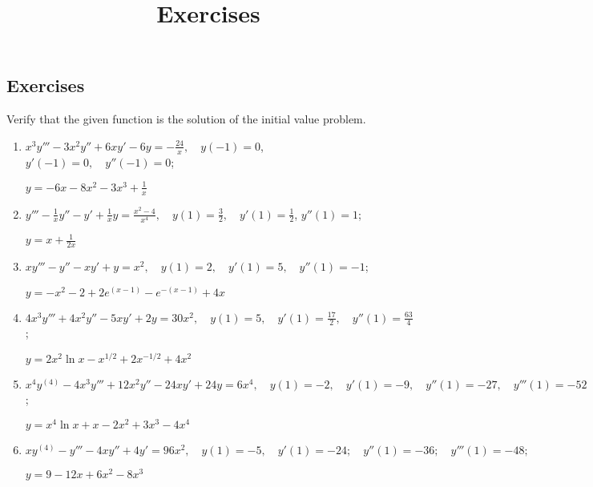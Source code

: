 \documentclass{ximera}
\title{Exercises} \license{CC BY-NC-SA 4.0}
\begin{document}
\begin{abstract}
\end{abstract}
\maketitle

\begin{onlineOnly}
\section*{Exercises}
\end{onlineOnly}



\begin{problem}\label{exer:9.1.1}
Verify that the given function is the solution of the initial
value problem.

\begin{enumerate}

\item $ x^3y'''-3x^2y''+6xy'-6y=-\frac{24}{x}, \quad  y(-1)=0$, $
y'(-1)=0, \quad  y''(-1)=0$;

$y=-6x-8x^2-3x^3+\frac{1}{x}$

\item $ y'''-\frac{1}{x}y''-y'+\frac{1}{x}y=\frac{x^2-4}{x^4}, \quad
y(1)=\frac{3}{2},\quad y'(1)=\frac{1}{2}$, $ y''(1)=1$;

$y=x+\frac{1}{2x}$

\item $xy'''-y''-xy'+y=x^2, \quad  y(1)=2,\quad y'(1)=5,\quad
y''(1)=-1$;

$y=-x^2-2+2e^{(x-1)}-e^{-(x-1)}+4x$

\item $4x^3y'''+4x^2y''-5xy'+2y=30x^2, \quad  y(1)=5,\quad
y'(1)=\frac{17}{2},\quad y''(1)=\frac{63}{4} $;

$y=2x^2\ln
x-x^{1/2}+2x^{-1/2}+4x^2$

\item $x^4y^{(4)}-4x^3y'''+12x^2y''-24xy'+24y=6x^4, \quad  y(1)=-2, \quad y'(1)=-9, \quad  y''(1)=-27,\quad y'''(1)=-52$;

$y=x^4\ln x+x-2x^2+3x^3-4x^4$

\item 
$xy^{(4)}-y'''-4xy''+4y'=96x^2, \quad  y(1)=-5,\quad y'(1)=-24; \quad y''(1)=-36; \quad   y'''(1)=-48;$

$y=9-12x+6x^2-8x^3$

\end{enumerate}
\end{problem}
\end{document}
